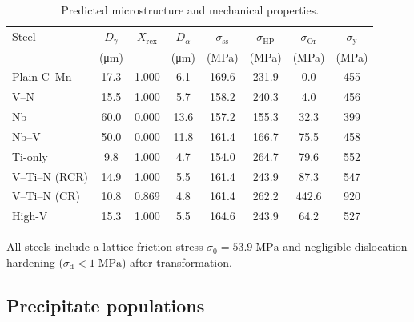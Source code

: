 \documentclass[11pt,a4paper]{article}
\newcommand{\DG}{\ensuremath{D_\gamma}}
\newcommand{\DA}{\ensuremath{D_\alpha}}
\newcommand{\Xrex}{\ensuremath{X_\mathrm{rex}}}
\newcommand{\sy}{\ensuremath{\sigma_\mathrm{y}}}
\begin{document}
\begin{table}[htbp]
\centering
\caption{Predicted microstructure and mechanical properties.}
\label{tab:results}
\begin{tabular}{@{}lSSSSSSS@{}}
\toprule
Steel & {\DG} & {\Xrex} & {\DA}
  & {$\sigma_\mathrm{ss}$} & {$\sigma_\mathrm{HP}$}
  & {$\sigma_\mathrm{Or}$} & {\sy} \\
  & {(\si{\micro\metre})} & {} & {(\si{\micro\metre})}
  & {(\si{\mega\pascal})} & {(\si{\mega\pascal})}
  & {(\si{\mega\pascal})} & {(\si{\mega\pascal})} \\
\midrule
Plain C--Mn    & 17.3  & 1.000 & 6.1   & 169.6 & 231.9 &   0.0 & 455 \\
V--N           & 15.5  & 1.000 & 5.7   & 158.2 & 240.3 &   4.0 & 456 \\
Nb             & 60.0  & 0.000 & 13.6  & 157.2 & 155.3 &  32.3 & 399 \\
Nb--V          & 50.0  & 0.000 & 11.8  & 161.4 & 166.7 &  75.5 & 458 \\
Ti-only        &  9.8  & 1.000 &  4.7  & 154.0 & 264.7 &  79.6 & 552 \\
V--Ti--N (RCR) & 14.9  & 1.000 &  5.5  & 161.4 & 243.9 &  87.3 & 547 \\
V--Ti--N (CR)  & 10.8  & 0.869 &  4.8  & 161.4 & 262.2 & 442.6 & 920 \\
High-V         & 15.3  & 1.000 &  5.5  & 164.6 & 243.9 &  64.2 & 527 \\
\bottomrule
\end{tabular}
\end{table}

\noindent All steels include a lattice friction stress
$\sigma_0 = 53.9\;\mathrm{MPa}$ and negligible dislocation
hardening ($\sigma_\mathrm{d} < 1\;\mathrm{MPa}$) after transformation.

\subsection{Precipitate populations}
\end{document}
